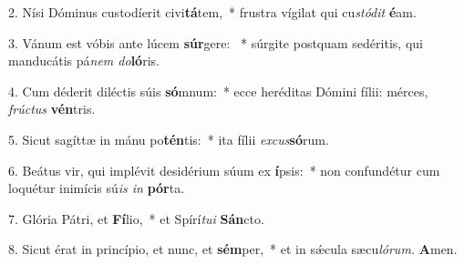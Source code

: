 \item 2. Nísi Dóminus custodíerit civi\textbf{tá}tem,~* frustra vígilat qui cu\textit{stódit} \textbf{é}am.

\item 3. Vánum est vóbis ante lúcem \textbf{súr}gere: ~* súrgite postquam sedéritis, qui manducátis pá\textit{nem do}\textbf{ló}ris.

\item 4. Cum déderit diléctis súis \textbf{só}mnum:~* ecce heréditas Dómini fílii: mérces, \textit{frúctus} \textbf{vén}tris.

\item 5. Sicut sagíttæ in mánu po\textbf{tén}tis:~* ita fílii \textit{excus}\textbf{só}rum.

\item 6. Beátus vir, qui implévit desidérium súum ex \textbf{í}psis:~* non confundétur cum loquétur inimícis sú\textit{is in} \textbf{pór}ta.

\item 7. Glória Pátri, et \textbf{Fí}lio,~* et Spírí\textit{tui} \textbf{Sán}cto.

\item 8. Sicut érat in princípio, et nunc, et \textbf{sém}per,~* et in sǽcula sæcu\textit{lórum.} \textbf{A}men.